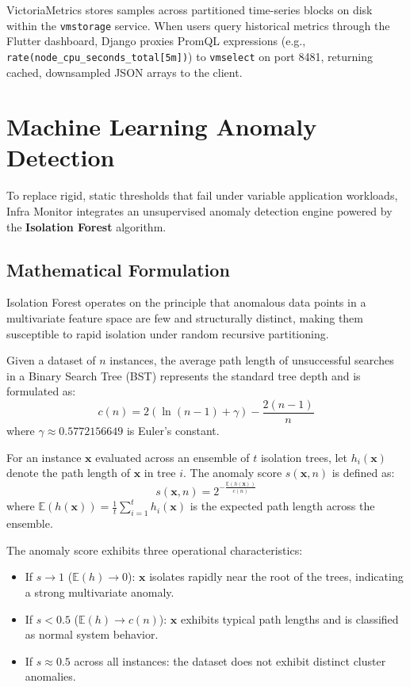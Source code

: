VictoriaMetrics stores samples across partitioned time-series blocks on disk within the \texttt{vmstorage} service. When users query historical metrics through the Flutter dashboard, Django proxies PromQL expressions (e.g., \texttt{rate(node\_cpu\_seconds\_total[5m])}) to \texttt{vmselect} on port 8481, returning cached, downsampled JSON arrays to the client.

\section{Machine Learning Anomaly Detection}
To replace rigid, static thresholds that fail under variable application workloads, Infra Monitor integrates an unsupervised anomaly detection engine powered by the \textbf{Isolation Forest} algorithm.

\subsection{Mathematical Formulation}
Isolation Forest operates on the principle that anomalous data points in a multivariate feature space are few and structurally distinct, making them susceptible to rapid isolation under random recursive partitioning.

Given a dataset of $n$ instances, the average path length of unsuccessful searches in a Binary Search Tree (BST) represents the standard tree depth and is formulated as:
\begin{equation}
  c(n) = 2 \left( \ln(n - 1) + \gamma \right) - \frac{2(n - 1)}{n}
\end{equation}
where $\gamma \approx 0.5772156649$ is Euler's constant.

For an instance $\mathbf{x}$ evaluated across an ensemble of $t$ isolation trees, let $h_i(\mathbf{x})$ denote the path length of $\mathbf{x}$ in tree $i$. The anomaly score $s(\mathbf{x}, n)$ is defined as:
\begin{equation}
  s(\mathbf{x}, n) = 2^{-\frac{\mathbb{E}(h(\mathbf{x}))}{c(n)}}
\end{equation}
where $\mathbb{E}(h(\mathbf{x})) = \frac{1}{t}\sum_{i=1}^t h_i(\mathbf{x})$ is the expected path length across the ensemble.

The anomaly score exhibits three operational characteristics:
\begin{itemize}
  \item If $s \to 1$ ($\mathbb{E}(h) \to 0$): $\mathbf{x}$ isolates rapidly near the root of the trees, indicating a strong multivariate anomaly.
  \item If $s < 0.5$ ($\mathbb{E}(h) \to c(n)$): $\mathbf{x}$ exhibits typical path lengths and is classified as normal system behavior.
  \item If $s \approx 0.5$ across all instances: the dataset does not exhibit distinct cluster anomalies.
\end{itemize}

